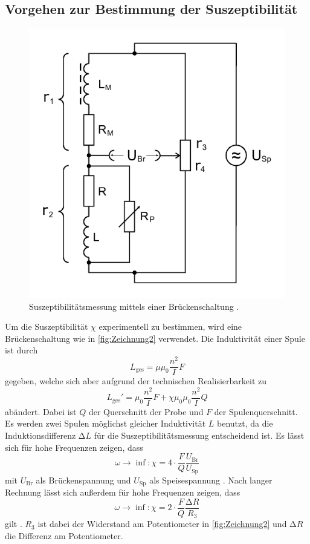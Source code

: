 \subsection{Vorgehen zur Bestimmung der Suszeptibilität}
\begin{figure}
    \center
    \includegraphics[width=0.5\linewidth]{pictures/Zeichnung2.pdf}
    \caption{Suszeptibilitätsmessung mittels einer Brückenschaltung \cite{v606}.}
    \label{fig:Zeichnung2}
\end{figure}
Um die Suszeptibilität $\chi$ experimentell zu bestimmen, wird eine Brückenschaltung wie in \autoref{fig:Zeichnung2} verwendet.
Die Induktivität einer Spule ist durch
\begin{equation*}
    L_\text{ges} = \mu \mu_0 \frac{n^2}{I} F
\end{equation*}
gegeben, welche sich aber aufgrund der technischen Realisierbarkeit zu
\begin{equation}
    L_\text{ges} ' = \mu_0 \frac{n^2}{I} F + \chi \mu_0 \mu_0 \frac{n^2}{I} Q
\end{equation}
abändert. Dabei ist $Q$ der Querschnitt der Probe und $F$ der Spulenquerschnitt.
Es werden zwei Spulen möglichst gleicher Induktivität $L$ benutzt, da die Induktionsdifferenz $\increment L$ für die Suszeptibilitätsmessung entscheidend ist.
Es lässt sich für hohe Frequenzen zeigen, dass
\begin{equation}\label{eq:delU}
    \omega \rightarrow \inf: \chi = 4 \cdot \frac{F}{Q} \frac{U_\text{Br}}{U_\text{Sp}}
\end{equation}
mit $U_\text{Br}$ als Brückenspannung und $U_\text{Sp}$ als Speisespannung \cite{v606}.
Nach langer Rechnung lässt sich außerdem für hohe Frequenzen zeigen, dass
\begin{equation}\label{eq:delR}
    \omega \rightarrow \inf: \chi = 2 \cdot  \frac{F}{Q}\frac{\increment R}{R_3}
\end{equation}
gilt \cite{v606}.
$R_3$ ist dabei der Widerstand am Potentiometer in \autoref{fig:Zeichnung2} und $\increment R$ die Differenz am Potentiometer.